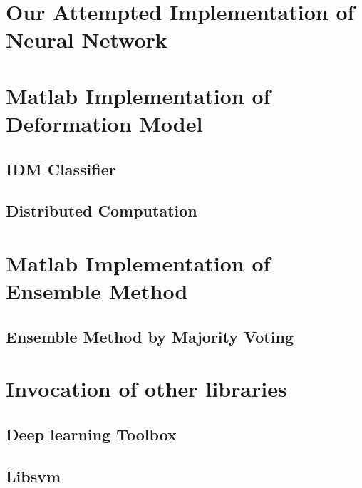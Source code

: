 \documentclass{article} %
\begin{document}
\section{Our Attempted Implementation of Neural Network}

\newpage


\section{Matlab Implementation of Deformation Model}
\subsection{IDM Classifier}

\newpage
\subsection{Distributed Computation}

\newpage

\section{Matlab Implementation of Ensemble Method}
\subsection{Ensemble Method by Majority Voting}


\newpage
\section{Invocation of other libraries}
\subsection{Deep learning Toolbox}

\subsection{Libsvm}

\end{document}
